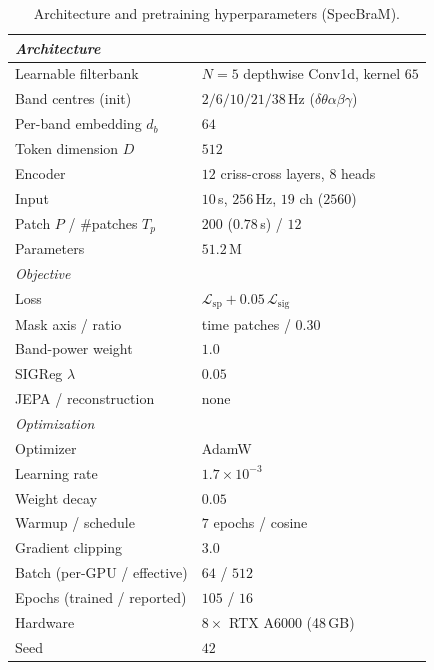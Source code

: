\documentclass[letterpaper]{article}
\begin{document}
\begin{table}[!ht]\centering\footnotesize
\setlength{\tabcolsep}{4pt}
\caption{Architecture and pretraining hyperparameters (SpecBraM).}
\label{tab:app_hp}
\begin{tabular}{ll}
\toprule
\multicolumn{2}{l}{\textit{Architecture}}\\
\midrule
Learnable filterbank        & $N{=}5$ depthwise Conv1d, kernel $65$\\
Band centres (init)         & $2/6/10/21/38$\,Hz ($\delta\theta\alpha\beta\gamma$)\\
Per-band embedding $d_b$    & $64$\\
Token dimension $D$         & $512$\\
Encoder                     & $12$ criss-cross layers, $8$ heads\\
Input                       & $10$\,s, $256$\,Hz, $19$ ch ($2560$)\\
Patch $P$ / \#patches $T_p$ & $200$ ($0.78$\,s) / $12$\\
Parameters                  & $51.2$\,M\\
\midrule
\multicolumn{2}{l}{\textit{Objective}}\\
\midrule
Loss                        & $\mathcal{L}_{\mathrm{sp}}+0.05\,\mathcal{L}_{\mathrm{sig}}$\\
Mask axis / ratio           & time patches / $0.30$\\
Band-power weight           & $1.0$\\
SIGReg $\lambda$            & $0.05$\\
JEPA / reconstruction       & none\\
\midrule
\multicolumn{2}{l}{\textit{Optimization}}\\
\midrule
Optimizer                   & AdamW\\
Learning rate               & $1.7{\times}10^{-3}$\\
Weight decay                & $0.05$\\
Warmup / schedule           & $7$ epochs / cosine\\
Gradient clipping           & $3.0$\\
Batch (per-GPU / effective) & $64$ / $512$\\
Epochs (trained / reported) & $105$ / $16$\\
Hardware                    & $8\times$ RTX A6000 (48\,GB)\\
Seed                        & $42$\\
\bottomrule
\end{tabular}
\end{table}
\end{document}
